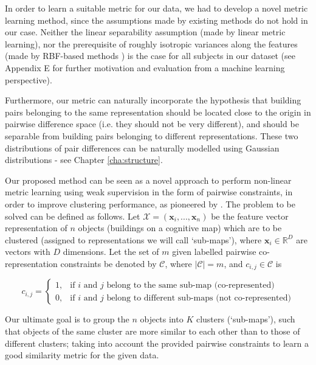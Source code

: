In order to learn a suitable metric for our data, we had to develop a novel metric learning method, since the assumptions made by existing methods do not hold in our case. Neither the linear separability assumption (made by linear metric learning), nor the prerequisite of roughly isotropic variances along the features (made by RBF-based methods \citep{ong2005learning}) is the case for all subjects in our dataset (see Appendix E for further motivation and evaluation from a machine learning perspective). 

Furthermore, our metric can naturally incorporate the hypothesis that building pairs belonging to the same representation should be located close to the origin in pairwise difference space (i.e. they should not be very different), and should be separable from building pairs belonging to different representations. These two distributions of pair differences can be naturally modelled using Gaussian distributions - see Chapter \ref{cha:structure}. 

Our proposed method can be seen as a novel approach to perform non-linear metric learning using weak supervision in the form of pairwise constraints, in order to improve clustering performance, as pioneered by \cite{xing2002distance}. The problem to be solved can be defined as follows. Let $\mathcal{X}=(\boldsymbol x_i, ..., \boldsymbol x_n)$ be the feature vector representation of $n$ objects (buildings on a cognitive map) which are to be clustered (assigned to representations we will call `sub-maps'), where $\bm x_i \in \mathbb{R}^D$ are vectors with $D$ dimensions. Let the set of $m$ given labelled pairwise co-representation constraints be denoted by $\mathcal{C}$, where $ \lvert \mathcal{C} \lvert = m $, and $c_{i,j} \in \mathcal{C}$ is

\begin{equation}
c_{i,j}=
\begin{cases}
1, & \text{if $i$ and $j$ belong to the same sub-map (co-represented)} \\
0, & \text{if $i$ and $j$ belong to different sub-maps (not co-represented)}
\end{cases}
\end{equation}

Our ultimate goal is to group the $n$ objects into $K$ clusters (`sub-maps'), such that objects of the same cluster are more similar to each other than to those of different clusters; taking into account the provided pairwise constraints to learn a good similarity metric for the given data.

